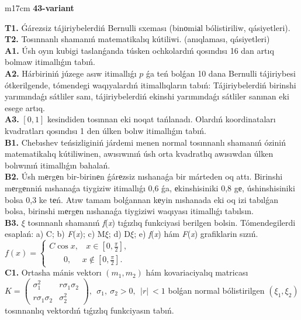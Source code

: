 \documentclass{article}
\begin{document}
\begin{tabular}{m{17cm}}
\textbf{43-variant}
\newline

\textbf{T1.} Ǵárezsiz tájiriybelerdiń Bernulli sxeması (binоmiаl bólistiriliw, qásiyetleri).
 \\
\textbf{T2.} Tosınnanlı shamanıń matematikalıq kútiliwi. (anıqlaması, qásiyetleri)
 \\
\textbf{A1.} Úsh oyın kubigi taslanǵanda túsken ochkolardıń qosındısı 16 dan artıq bolmaw itimallıǵın tabıń.
 \\
\textbf{A2.} Hárbiriniń júzege asıw itimallıǵı $p$ ǵa teń bolǵan 10 dana Bernulli tájiriybesi ótkerilgende, tómendegi waqıyalardıń itimallıqların tabıń: Tájiriybelerdiń birinshi yarımındaǵı sátliler sanı, tájiriybelerdiń ekinshi yarımındaǵı sátliler sanınan eki esege artıq.
 \\
\textbf{A3.} $\left[ 0,1 \right]$ kesindiden tosınnan eki noqat  tańlanadı. Olardıń koordinataları kvadratları qosındısı 1 den úlken bolıw itimallıǵın tabıń.
 \\
\textbf{B1.} Chebıshev teńsizliginiń járdemi menen normal tosınnanlı shamanıń óziniń matematikalıq kútiliwinen, awısıwınıń úsh orta kvadratlıq awısıwdan úlken bolıwınıń itimallıǵın bahalań.
 \\
\textbf{B2.} Úsh mеrgеn bir-birinеn ǵárеzsiz nıshanaǵa bir márteden oq attı. Birinshi mеrgеnniń nıshanaǵa tiygiziw itimallıǵı 0,6 ǵa, еkinshisiniki 0,8 gе, úshinshisiniki bolsa 0,3 ke tеń. Atıw tamam bolǵannan kеyin nıshanada eki oq izi tabılǵan bolsa, birinshi mеrgеn nıshanaǵa tiygiziwi waqıyası itimallıǵı tabılsın.
 \\
\textbf{B3.} $\xi$ tosınnanlı shamanıń \emph{f}(\emph{x}) tıǵızlıq funkciyasi berilgen bolsin. Tómendegilerdi esaplań: a) C; b) \emph{F}(\emph{x}); c) M$\xi$; d) D$\xi$; e) \emph{f}(\emph{x}) hám \emph{F}(\emph{x}) grafiklarin sızıń.\(f(x) = \left\{ \begin{matrix}
C\cos x,\ \ \ \ x \in \left\lbrack 0,\frac{\pi}{2} \right\rbrack, \\
\ \ \ \ \ \ \ \ 0,\ \ \ \ \ \ x \notin \left\lbrack 0,\frac{\pi}{2} \right\rbrack.\ \ 
\end{matrix} \right.\ \)
 \\
\textbf{C1.} Ortasha mánis vektorı \(\left( m_{1},m_{2} \right)\) hám kovariaciyalıq matricası\(K = \begin{pmatrix}
\sigma_{1}^{2} & r\sigma_{1}\sigma_{2} \\
r\sigma_{1}\sigma_{2} & \sigma_{2}^{2}
\end{pmatrix},\ \ \sigma_{1},\ \sigma_{2} > 0,\ \ |r|\  < 1\) bolǵan normal bólistirilgen \(\left( \xi_{1},\xi_{2} \right)\) tosınnanlıq vektordıń tıǵızlıq funkciyasın tabıń.

\end{tabular}
\end{document}
